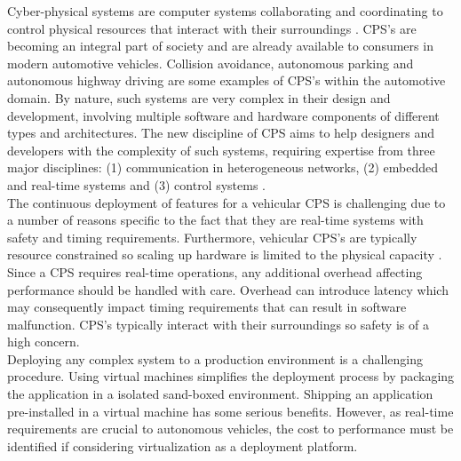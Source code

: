Cyber-physical systems are computer systems collaborating and coordinating to control physical resources that interact with their surroundings \cite{cps}. CPS's are becoming an integral part of society and are already available to consumers in modern automotive vehicles. Collision avoidance, autonomous parking and autonomous highway driving are some examples of CPS's within the automotive domain. By nature, such systems are very complex in their design and development, involving multiple software and hardware components of different types and architectures. The new discipline of CPS aims to help designers and developers with the complexity of such systems, requiring expertise from three major disciplines: (1) communication in heterogeneous networks, (2) embedded and real-time systems and (3) control systems \cite{gonz}. \\

The continuous deployment of features for a vehicular CPS is challenging due to a number of reasons specific to the fact that they are real-time systems with safety and timing requirements. Furthermore, vehicular CPS's are typically resource constrained so scaling up hardware is limited to the physical capacity \cite{wan2011advances}. Since a CPS requires real-time operations, any additional overhead affecting performance should be handled with care. Overhead can introduce latency which may consequently impact timing requirements that can result in software malfunction. CPS's typically interact with their surroundings so safety is of a high concern. \\

Deploying any complex system to a production environment is a challenging procedure. Using virtual machines simplifies the deployment process by packaging the application in a isolated sand-boxed environment. Shipping an application pre-installed in a virtual machine has some serious benefits. However, as real-time requirements are crucial to autonomous vehicles, the cost to performance must be identified if considering virtualization as a deployment platform.\\


